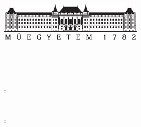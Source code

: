 \begin{titlepage}
  \begin{center}  
  \includegraphics[width=7cm]{./figures/bme_logo.pdf}
  \vspace{0.3cm}
  
  \bme \\
  \vik \\
  \viktanszek \\
  \vspace{5cm}
  
  \huge {\vikcim}
  \vspace{1.5cm}
  
  \large {\textbf{\tdk}}
  \vfill
    
  {\Large 
  	\keszitette: \\ \vspace{0.3cm}
  	\szerzo \\
	\tdkszerzoB \\
  	\vspace{1.5cm}
  	\konzulens: \\ \vspace{0.3cm}
  	\vikkonzulensA \\
  }
  
  \vspace{2cm}
  \large {\tdkev}
 \end{center}
\end{titlepage}
